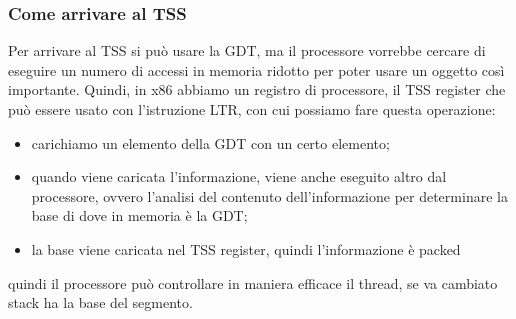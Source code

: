 \documentclass[12pt, oneside]{extbook}
\begin{document}
\subsubsection{Come arrivare al TSS}
Per arrivare al TSS si può usare la GDT, ma il processore vorrebbe cercare di eseguire un numero di accessi in memoria ridotto per poter usare un oggetto così importante. Quindi, in x86 abbiamo un registro di processore, il TSS register che può essere usato con l'istruzione \textsf{LTR}, con cui possiamo fare questa operazione:
\begin{itemize}
\item carichiamo un elemento della GDT con un certo elemento;
\item quando viene caricata l'informazione, viene anche eseguito altro dal processore, ovvero l'analisi del contenuto dell'informazione per determinare la base di dove in memoria è la GDT;
\item la base viene caricata nel TSS register, quindi l'informazione è packed
\end{itemize}
quindi il processore può controllare in maniera efficace il thread, se va cambiato stack ha la base del segmento.
\end{document}

